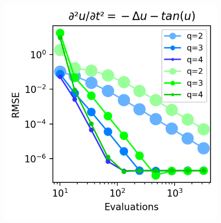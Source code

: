 \begin{figure}
    \caption{}
    \label{fig:wave medium}
    \includegraphics[width=\columnwidth]{../images/solver_wave and big tan.png}
    \caption{}
    \label{fig:wave big}
\end{figure}


\ifdefined\COMPILINGFROMMAIN
\else    
    
\fi